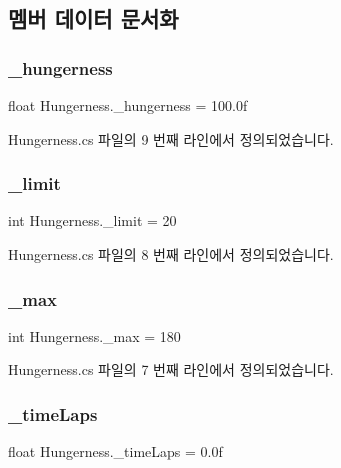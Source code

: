 \subsection{멤버 데이터 문서화}
\mbox{\label{class_hungerness_abcd3f8c8cd69443a8c91a03c06e65d4a}} 
\subsubsection{\texorpdfstring{\_hungerness}{\_hungerness}}
{\footnotesize\ttfamily float Hungerness.\+\_\+hungerness = 100.\+0f}



Hungerness.\+cs 파일의 9 번째 라인에서 정의되었습니다.

\mbox{\label{class_hungerness_ac3295f7f5834a46713bf304a080ac16d}} 
\subsubsection{\texorpdfstring{\_limit}{\_limit}}
{\footnotesize\ttfamily int Hungerness.\+\_\+limit = 20}



Hungerness.\+cs 파일의 8 번째 라인에서 정의되었습니다.

\mbox{\label{class_hungerness_a5879cd7fdf6d8b2c490507909f370d34}} 
\subsubsection{\texorpdfstring{\_max}{\_max}}
{\footnotesize\ttfamily int Hungerness.\+\_\+max = 180}



Hungerness.\+cs 파일의 7 번째 라인에서 정의되었습니다.

\mbox{\label{class_hungerness_a673889b258306ea30e56d0c6546806af}} 
\subsubsection{\texorpdfstring{\_timeLaps}{\_timeLaps}}
{\footnotesize\ttfamily float Hungerness.\+\_\+time\+Laps = 0.\+0f\hspace{0.3cm}{\ttfamily [private]}}



